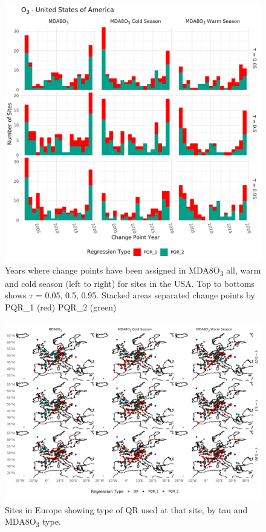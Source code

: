 \documentclass{article}
\begin{document}
\begin{figure}[p]
\centering
\includegraphics[width=\linewidth]{figures/si_figures/fS02_cp_year_o3_United-States-of-America.pdf}
\caption{Years where change points have been assigned in MDA8O\textsubscript{3} all, warm and cold season (left to right) for sites in the USA. Top to bottoms shows $\tau$ = 0.05, 0.5, 0.95. Stacked areas separated change points by PQR\_1 (red) PQR\_2 (green)}
\label{si_fig:cp_year_usa}
\end{figure}
\clearpage

\begin{figure}
\centering
\includegraphics[width=\linewidth]{figures/si_figures/fS03_regression_type_map_eu.pdf}
\caption{Sites in Europe showing type of QR used at that site, by tau and MDA8O\textsubscript{3} type.}
\label{si_fig:reg_map_eu}
\end{figure}
\clearpage
\end{document}
